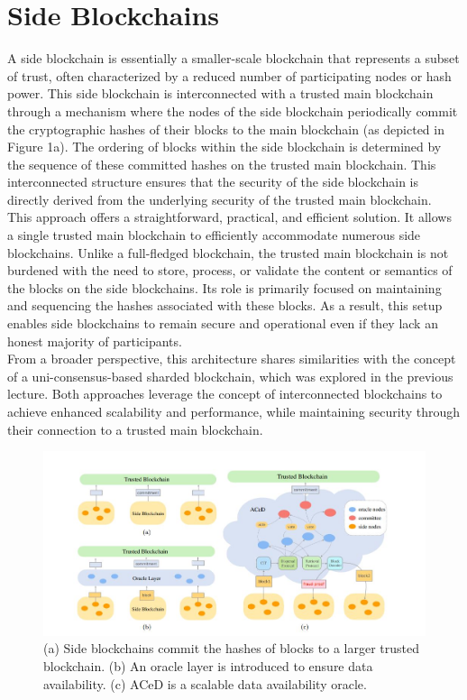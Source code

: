 \section{Side Blockchains}
A side blockchain is essentially a smaller-scale blockchain that represents a subset of trust, often characterized by a reduced number of participating nodes or hash power. This side blockchain is interconnected with a trusted main blockchain through a mechanism where the nodes of the side blockchain periodically commit the cryptographic hashes of their blocks to the main blockchain (as depicted in Figure 1a). The ordering of blocks within the side blockchain is determined by the sequence of these committed hashes on the trusted main blockchain. This interconnected structure ensures that the security of the side blockchain is directly derived from the underlying security of the trusted main blockchain.\\
This approach offers a straightforward, practical, and efficient solution. It allows a single trusted main blockchain to efficiently accommodate numerous side blockchains. Unlike a full-fledged blockchain, the trusted main blockchain is not burdened with the need to store, process, or validate the content or semantics of the blocks on the side blockchains. Its role is primarily focused on maintaining and sequencing the hashes associated with these blocks. As a result, this setup enables side blockchains to remain secure and operational even if they lack an honest majority of participants. \\
From a broader perspective, this architecture shares similarities with the concept of a uni-consensus-based sharded blockchain, which was explored in the previous lecture. Both approaches leverage the concept of interconnected blockchains to achieve enhanced scalability and performance, while maintaining security through their connection to a trusted main blockchain.
\begin{center}
	\begin{figure}
		\centering
		\includegraphics[width=0.8\linewidth]{Fig/L12_F1}
		\caption{(a) Side blockchains commit the hashes of blocks to a larger trusted blockchain. (b) An oracle layer is introduced to ensure data availability. (c) ACeD is a scalable data availability oracle.
		}
		\label{fig:f1}
	\end{figure}
\end{center}
